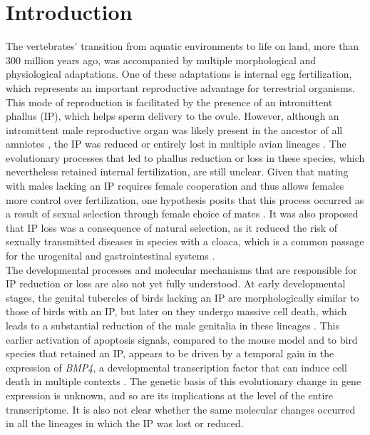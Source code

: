 \section{Introduction}
The vertebrates’ transition from aquatic environments to life on land, more than 300 million years ago, was accompanied by multiple morphological and physiological adaptations. One of these adaptations is internal egg fertilization, which represents an important reproductive advantage for terrestrial organisms. This mode of reproduction is facilitated by the presence of an intromittent phallus (IP), which helps sperm delivery to the ovule. However, although an intromittent male reproductive organ was likely present in the ancestor of all amniotes \citep{brennan_evolution_2016}, the IP was reduced or entirely lost in multiple avian lineages \citep{herrera_developmental_2013}. The evolutionary processes that led to phallus reduction or loss in these species, which nevertheless retained internal fertilization, are still unclear. Given that mating with males lacking an IP requires female cooperation and thus allows females more control over fertilization, one hypothesis posits that this process occurred as a result of sexual selection through female choice of mates \citep{briskie_sexual_1997}. It was also proposed that IP loss was a consequence of natural selection, as it reduced the risk of sexually transmitted diseases in species with a cloaca, which is a common passage for the urogenital and gastrointestinal systems \citep{briskie_sexual_1997}. \\

The developmental processes and molecular mechanisms that are responsible for IP reduction or loss are also not yet fully understood. At early developmental stages, the genital tubercles of birds lacking an IP are morphologically similar to those of birds with an IP, but later on they undergo massive cell death, which leads to a substantial reduction of the male genitalia in these lineages \citep{herrera_developmental_2013}. This earlier activation of apoptosis signals, compared to the mouse model and to bird species that retained an IP, appears to be driven by a temporal gain in the expression of \textit{BMP4}, a developmental transcription factor that can induce cell death in multiple contexts \citep{herrera_developmental_2013}. The genetic basis of this evolutionary change in gene expression is unknown, and so are its implications at the level of the entire transcriptome. It is also not clear whether the same molecular changes occurred in all the lineages in which the IP was lost or reduced.\\

